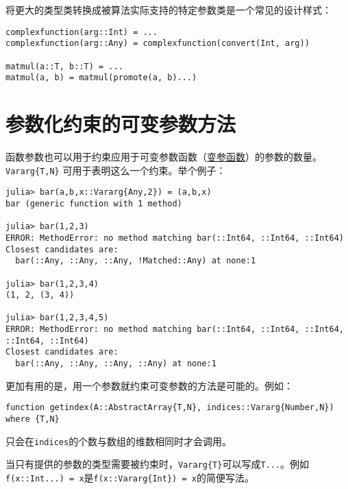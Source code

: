 将更大的类型类转换成被算法实际支持的特定参数类是一个常见的设计样式：




\begin{verbatim}
complexfunction(arg::Int) = ...
complexfunction(arg::Any) = complexfunction(convert(Int, arg))

matmul(a::T, b::T) = ...
matmul(a, b) = matmul(promote(a, b)...)
\end{verbatim}



\hypertarget{3661198273813942193}{}


\section{参数化约束的可变参数方法}



函数参数也可以用于约束应用于{\textquotedbl}可变参数{\textquotedbl}函数（\hyperlink{9965084594348935329}{变参函数}）的参数的数量。\texttt{Vararg\{T,N\}} 可用于表明这么一个约束。举个例子：




\begin{verbatim}
julia> bar(a,b,x::Vararg{Any,2}) = (a,b,x)
bar (generic function with 1 method)

julia> bar(1,2,3)
ERROR: MethodError: no method matching bar(::Int64, ::Int64, ::Int64)
Closest candidates are:
  bar(::Any, ::Any, ::Any, !Matched::Any) at none:1

julia> bar(1,2,3,4)
(1, 2, (3, 4))

julia> bar(1,2,3,4,5)
ERROR: MethodError: no method matching bar(::Int64, ::Int64, ::Int64, ::Int64, ::Int64)
Closest candidates are:
  bar(::Any, ::Any, ::Any, ::Any) at none:1
\end{verbatim}



更加有用的是，用一个参数就约束可变参数的方法是可能的。例如：




\begin{verbatim}
function getindex(A::AbstractArray{T,N}, indices::Vararg{Number,N}) where {T,N}
\end{verbatim}



只会在\texttt{indices}的个数与数组的维数相同时才会调用。



当只有提供的参数的类型需要被约束时，\texttt{Vararg\{T\}}可以写成\texttt{T...}。例如\texttt{f(x::Int...) = x}是\texttt{f(x::Vararg\{Int\}) = x}的简便写法。



